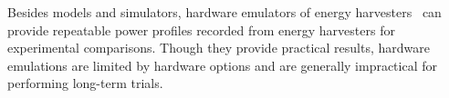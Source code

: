 Besides models and simulators, hardware emulators of energy harvesters~\cite{10.1145/2668332.2668336, 10.1145/3356250.3360042} can provide repeatable power profiles recorded from energy harvesters for experimental comparisons. 
Though they provide practical results, hardware emulations are limited by hardware options and are generally impractical for performing long-term trials.


